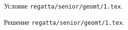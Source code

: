 \problem
Условие \texttt{regatta/senior/geomt/1.tex}.

\solution Решение \texttt{regatta/senior/geomt/1.tex}.
\endproblem
